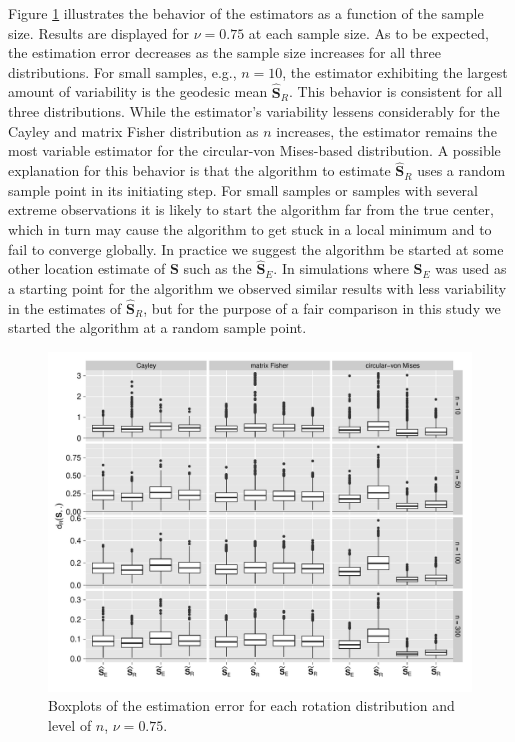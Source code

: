 \documentclass[12pt]{article}
\newcommand{\ProjMean}{{\widehat{\bm S}_E}}
\newcommand{\GeomMean}{{\widehat{\bm S}_R}}
\begin{document}
\noindent Figure \ref{fig:NBoxes} illustrates the behavior of the estimators as a function of the sample size. Results are displayed for  $\nu=0.75$ at each sample size. As to be expected, the estimation error decreases as the sample size increases for all three distributions. For small samples, e.g., $n=10$, the estimator exhibiting the largest amount of variability is the geodesic mean $\GeomMean$. This behavior is consistent for all three distributions.  While the estimator's variability lessens considerably for the Cayley and matrix Fisher distribution as $n$ increases, the estimator remains the most variable estimator for the circular-von Mises-based distribution.  A possible explanation for this behavior is that the algorithm to estimate $\GeomMean$ uses a random sample point in its initiating step.  For small samples or samples with several extreme observations it is likely to start the algorithm far from the true center, which in turn may cause the algorithm to get stuck in a local minimum and to fail to converge globally.  In practice we suggest the algorithm be started at some other location estimate of $\bm S$ such as the $\ProjMean$. In simulations where $\ProjMean$ was used as a starting point for the algorithm we observed  similar results with less variability in the estimates of $\GeomMean$, but for the purpose of a fair comparison in this study we started the algorithm at a random sample point.


\begin{figure}[h!]
\centering
\includegraphics[width=1\textwidth]{Nu75AllNBoxes.pdf}
\caption{Boxplots of the estimation error for each rotation distribution and level of $n$,  $\nu=0.75$.}
\label{fig:NBoxes}
\end{figure}
\end{document}

